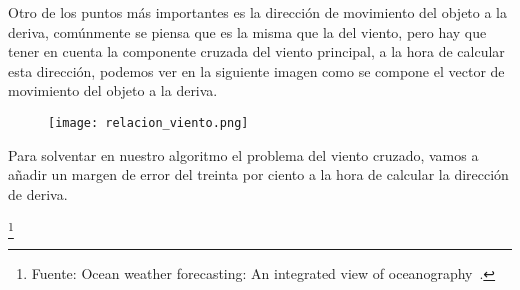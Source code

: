 Otro de los puntos más importantes es la dirección de movimiento del 
objeto a la deriva, comúnmente se piensa que es la misma que la del viento,
 pero hay que tener en cuenta la componente cruzada del viento principal, a
 la hora de calcular esta dirección, podemos ver en la siguiente imagen como 
se compone el vector de movimiento del objeto a la deriva.


\begin{figure}[h]
\texttt{[image: relacion\_viento.png]} 
\end{figure}


Para solventar en nuestro algoritmo el problema del viento cruzado, vamos a añadir un margen de error del treinta por ciento a la hora de calcular la dirección de deriva. 

\footnote{Fuente: Ocean weather forecasting: An integrated view of oceanography~\cite{DDERIVA}.}